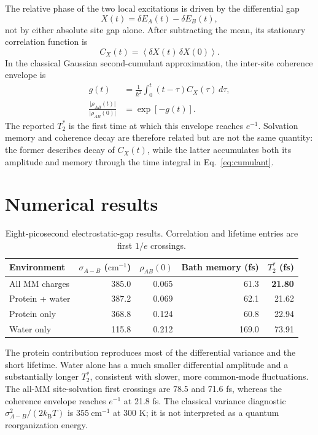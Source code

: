 \documentclass[11pt]{article}
\newcommand{\wn}{\mathrm{cm}^{-1}}
\newcommand{\Ttwo}{T_2^{*}}
\begin{document}
The relative phase of the two local excitations is driven by the differential
gap
\begin{equation}
  X(t)=\delta E_A(t)-\delta E_B(t),
\end{equation}
not by either absolute site gap alone.  After subtracting the mean, its
stationary correlation function is
\begin{equation}
  C_X(t)=\left\langle \delta X(t)\,\delta X(0)\right\rangle .
\end{equation}
In the classical Gaussian second-cumulant approximation, the inter-site
coherence envelope is
\begin{align}
  g(t) &= \frac{1}{\hbar^2}\int_0^t (t-\tau)C_X(\tau)\,d\tau,\\
  \frac{\lvert\rho_{AB}(t)\rvert}{\lvert\rho_{AB}(0)\rvert}
       &= \exp[-g(t)].
  \label{eq:cumulant}
\end{align}
The reported $\Ttwo$ is the first time at which this envelope reaches $e^{-1}$.
Solvation memory and coherence decay are therefore related but are not the same
quantity: the former describes decay of $C_X(t)$, while the latter accumulates
both its amplitude and memory through the time integral in
Eq.~\eqref{eq:cumulant}.

\section{Numerical results}

\begin{table}[ht]
\centering
\caption{Eight-picosecond electrostatic-gap results.  Correlation and lifetime
entries are first $1/e$ crossings.}
\label{tab:components}
\small
\begin{tabular}{lrrrr}
\toprule
Environment & $\sigma_{A-B}$ ($\wn$) & $\rho_{AB}(0)$ & Bath memory (fs) & $\Ttwo$ (fs)\\
\midrule
All MM charges       & 385.0 & 0.065 & 61.3  & \textbf{21.80}\\
Protein + water      & 387.2 & 0.069 & 62.1  & 21.62\\
Protein only         & 368.8 & 0.124 & 60.8  & 22.94\\
Water only           & 115.8 & 0.212 & 169.0 & 73.91\\
\bottomrule
\end{tabular}
\end{table}

The protein contribution reproduces most of the differential variance and the
short lifetime.  Water alone has a much smaller differential amplitude and a
substantially longer $\Ttwo$, consistent with slower, more common-mode
fluctuations.  The all-MM site-solvation first crossings are 78.5 and 71.6 fs,
whereas the coherence envelope reaches $e^{-1}$ at 21.8 fs.  The classical
variance diagnostic $\sigma_{A-B}^2/(2k_{\mathrm B}T)$ is $355\ \wn$ at 300 K;
it is not interpreted as a quantum reorganization energy.
\end{document}
